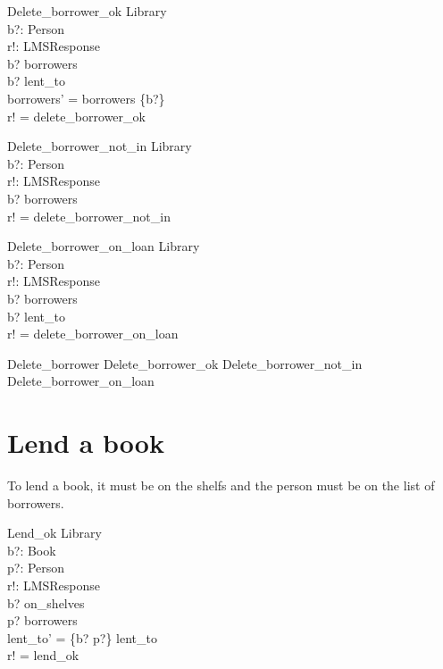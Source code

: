 \documentclass[11pt, fuzz]{article}
\begin{document}
\begin{schema}{Delete\_borrower\_ok}
    \Delta Library  \\
    b?: Person      \\
    r!: LMSResponse \\
\where
    b? \in borrowers                        \\
    b? \notin \ran lent\_to                 \\
    borrowers' = borrowers \setminus \{b?\} \\
    r! = delete\_borrower\_ok               \\
\end{schema}

\begin{schema}{Delete\_borrower\_not\_in}
    \Xi Library     \\
    b?: Person      \\
    r!: LMSResponse \\
\where
    b? \notin borrowers            \\
    r! = delete\_borrower\_not\_in \\
\end{schema}

\begin{schema}{Delete\_borrower\_on\_loan}
    \Xi Library     \\
    b?: Person      \\
    r!: LMSResponse \\
\where
    b? \in borrowers                        \\
    b? \in \ran lent\_to                    \\
    r! = delete\_borrower\_on\_loan         \\
\end{schema}

\begin{zed}
    Delete\_borrower  Delete\_borrower\_ok \lor Delete\_borrower\_not\_in \lor \\ Delete\_borrower\_on\_loan
\end{zed}


\section{Lend a book}

To lend a book, it must be on the shelfs and the person must be on the list of borrowers. 

\begin{schema}{Lend\_ok}
    \Delta Library  \\
    b?: Book        \\
    p?: Person      \\
    r!: LMSResponse \\
\where
    b? \in on\_shelves                          \\
    p? \in borrowers                            \\
    lent\_to' = \{b? \mapsto p?\} \cup lent\_to \\
    r! = lend\_ok                               \\
\end{schema}
\end{document}
